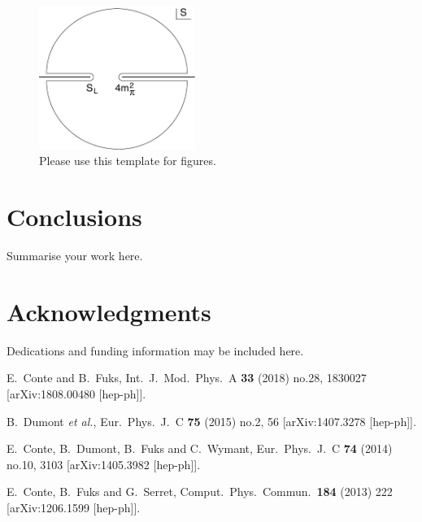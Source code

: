 \documentclass{ws-mpla}
\begin{document}
\begin{figure}[t]
  \centerline{\includegraphics[width=2.0in]{mplaf1}}
  \vspace*{8pt}
  \caption{Please use this template for figures.\protect\label{fig1}}
\end{figure}

\section{Conclusions}
Summarise your work here.

\section*{Acknowledgments}
Dedications and funding information may be included here.

\begin{thebibliography}{0}
  E.~Conte and B.~Fuks,
  Int.\ J.\ Mod.\ Phys.\ A {\bf 33} (2018) no.28,  1830027
  [arXiv:1808.00480 [hep-ph]].

  B.~Dumont {\it et al.},
  Eur.\ Phys.\ J.\ C {\bf 75} (2015) no.2,  56
  [arXiv:1407.3278 [hep-ph]].

  E.~Conte, B.~Dumont, B.~Fuks and C.~Wymant,
  Eur.\ Phys.\ J.\ C {\bf 74} (2014) no.10,  3103
  [arXiv:1405.3982 [hep-ph]].

  E.~Conte, B.~Fuks and G.~Serret,
  Comput.\ Phys.\ Commun.\  {\bf 184} (2013) 222
  [arXiv:1206.1599 [hep-ph]].

\end{thebibliography}
\end{document}
